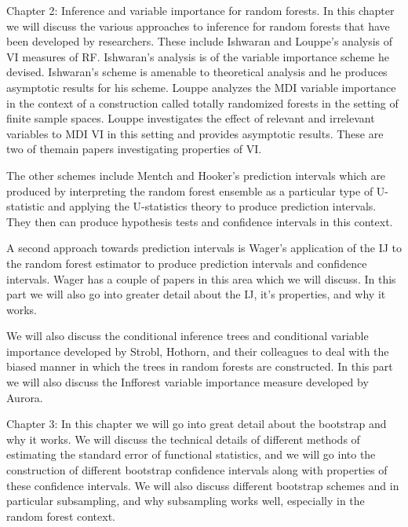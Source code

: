 \documentclass[12pt,twoside]{reedthesis}
\theoremstyle{definition}
\theoremstyle{definition}
\theoremstyle{definition}
\theoremstyle{remark}
\begin{document}
Chapter 2: Inference and variable importance for random forests. In this
chapter we will discuss the various approaches to inference for random
forests that have been developed by researchers. These include Ishwaran
and Louppe's analysis of VI measures of RF. Ishwaran's analysis is of
the variable importance scheme he devised. Ishwaran's scheme is amenable
to theoretical analysis and he produces asymptotic results for his
scheme. Louppe analyzes the MDI variable importance in the context of a
construction called totally randomized forests in the setting of finite
sample spaces. Louppe investigates the effect of relevant and irrelevant
variables to MDI VI in this setting and provides asymptotic results.
These are two of themain papers investigating properties of VI.

The other schemes include Mentch and Hooker's prediction intervals which
are produced by interpreting the random forest ensemble as a particular
type of U-statistic and applying the U-statistics theory to produce
prediction intervals. They then can produce hypothesis tests and
confidence intervals in this context.

A second approach towards prediction intervals is Wager's application of
the IJ to the random forest estimator to produce prediction intervals
and confidence intervals. Wager has a couple of papers in this area
which we will discuss. In this part we will also go into greater detail
about the IJ, it's properties, and why it works.

We will also discuss the conditional inference trees and conditional
variable importance developed by Strobl, Hothorn, and their colleagues
to deal with the biased manner in which the trees in random forests are
constructed. In this part we will also discuss the Infforest variable
importance measure developed by Aurora.

Chapter 3: In this chapter we will go into great detail about the
bootstrap and why it works. We will discuss the technical details of
different methods of estimating the standard error of functional
statistics, and we will go into the construction of different bootstrap
confidence intervals along with properties of these confidence
intervals. We will also discuss different bootstrap schemes and in
particular subsampling, and why subsampling works well, especially in
the random forest context.
\end{document}
